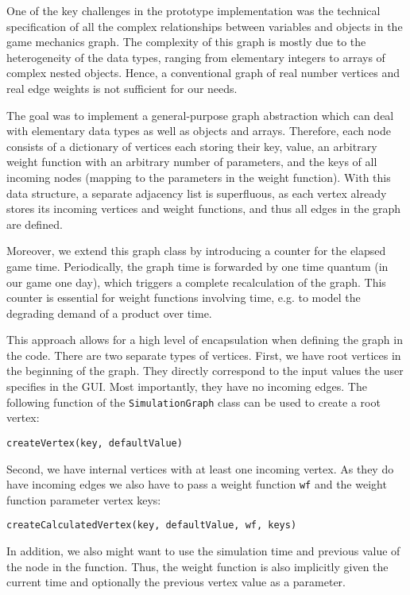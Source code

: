 One of the key challenges in the prototype implementation was the technical specification of all the complex relationships between variables and objects in the game mechanics graph. The complexity of this graph is mostly due to the heterogeneity of the data types, ranging from elementary integers to arrays of complex nested objects. 
Hence, a conventional graph of real number vertices and real edge weights is not sufficient for our needs.
 
 
The goal was to implement a general-purpose graph abstraction which can deal with elementary data types as well as objects and arrays.
Therefore, each node consists of a dictionary of vertices each storing their key, value, an arbitrary weight function with an arbitrary number of parameters, and the keys of all incoming nodes (mapping to the parameters in the weight function). With this data structure, a separate adjacency list is superfluous, as each vertex already stores its incoming vertices and weight functions, and thus all edges in the graph are defined.


Moreover, we extend this graph class by introducing a counter for the elapsed game time. Periodically, the graph time is forwarded by one time quantum (in our game one day), which triggers a complete recalculation of the graph. This counter is essential for weight functions involving time, e.g. to model the degrading demand of a product over time.

This approach allows for a high level of encapsulation when defining the graph in the code. There are two separate types of vertices. First, we have root vertices in the beginning of the graph. They directly correspond to the input values the user specifies in the GUI. Most importantly, they have no incoming edges. The following function of the \texttt{SimulationGraph} class can be used to create a root vertex:

\begin{center}
	\texttt{createVertex(key, defaultValue)}
\end{center}

Second, we have internal vertices with at least one incoming vertex. As they do have incoming edges we also have to pass a weight function \texttt{wf} and the weight function parameter vertex keys:
\begin{center}
	\texttt{createCalculatedVertex(key, defaultValue, wf, keys)}
\end{center}
 
 In addition, we also might want to use the simulation time and previous value of the node in the function. Thus, the weight function is also implicitly given the current time and optionally the previous vertex value as a parameter.
 
